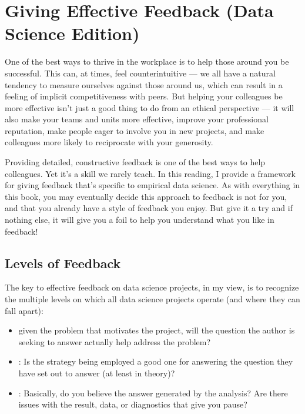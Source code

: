 \documentclass[letterpaper,10pt,english]{jupyterBook}
\begin{document}
\sphinxstepscope


\chapter{Giving Effective Feedback (Data Science Edition)}
\label{\detokenize{40_in_practice/30_giving_feedback:giving-effective-feedback-data-science-edition}}\label{\detokenize{40_in_practice/30_giving_feedback::doc}}
\sphinxAtStartPar
One of the best ways to thrive in the workplace is to help those around you be successful. This can, at times, feel counter\sphinxhyphen{}intuitive — we all have a natural tendency to measure ourselves against those around us, which can result in a feeling of implicit competitiveness with peers. But helping your colleagues be more effective isn’t just a good thing to do from an ethical perspective — it will also make your teams and units more effective, improve your professional reputation, make people eager to involve you in new projects, and make colleagues more likely to reciprocate with your generosity.

\sphinxAtStartPar
Providing detailed, constructive feedback is one of the best ways to help colleagues. Yet it’s a skill we rarely teach. In this reading, I provide a framework for giving feedback that’s specific to empirical data science. As with everything in this book, you may eventually decide this approach to feedback is not for you, and that you already have a style of feedback you enjoy. But give it a try and if nothing else, it will give you a foil to help you understand what you  like in feedback!


\section{Levels of Feedback}
\label{\detokenize{40_in_practice/30_giving_feedback:levels-of-feedback}}
\sphinxAtStartPar
The key to effective feedback on data science projects, in my view, is to recognize the multiple levels on which all data science projects operate (and where they can fall apart):
\begin{itemize}
\item {} 
\sphinxAtStartPar
{} given the problem that motivates the project, will the question the author is seeking to answer actually help address the problem?

\item {} 
\sphinxAtStartPar
{}: Is the strategy being employed a good one for answering the question they have set out to answer (at least in theory)?

\item {} 
\sphinxAtStartPar
{}: Basically, do you believe the answer generated by the analysis? Are there issues with the result, data, or diagnostics that give you pause?

\end{itemize}
\end{document}
